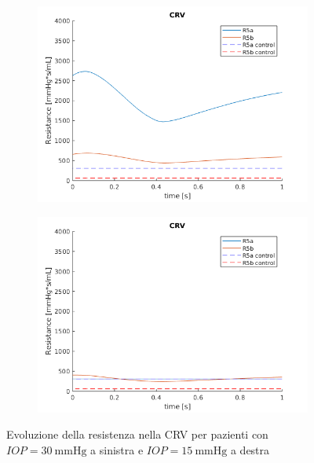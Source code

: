\documentclass{article}
\begin{document}
\begin{figure}[ht]
\begin{subfigure}{.5\textwidth}
  \centering
  \includegraphics[width=1.0\linewidth]{Pictures/IOP30_part1/CRV_30.png}
\end{subfigure}
\begin{subfigure}{.5\textwidth}
  \centering
  \includegraphics[width=1.0\linewidth]{Pictures/IOP15_part1/CRV_15.png}
\end{subfigure}
\caption{Evoluzione della resistenza nella CRV per pazienti con $IOP = \SI{30}{\mmHg}$ a sinistra e $IOP = \SI{15}{\mmHg}$ a destra}
\label{CRV1530}
\end{figure}
\end{document}
